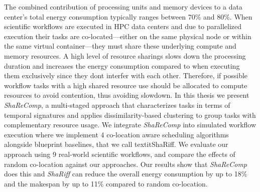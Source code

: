 \documentclass[a4paper, 11pt]{article}
\begin{document}
The combined contribution of processing units and memory devices to a data center's total energy consumption typically ranges between 70\% and 80\%. When scientific workflows are executed in HPC data centers and due to parallelized execution their tasks are co-located—either on the same physical node or within the same virtual container—they must share these underlying compute and memory resources. A high level of resource sharings slows down the processing duration and increases the energy consumption compared to when executing them exclusively since they dont interfer with each other. Therefore, if possible workflow tasks with a high shared resource use should be allocated to compute resources to avoid contention, thus avoiding slowdown. In this thesis we present \textit{ShaReComp}, a multi-staged approach that characterizes tasks in terms of temporal signatures and applies dissimilarity-based clustering to group tasks with complementary resource usage. We integrate \textit{ShaReComp} into simulated workflow execution where we implement 4 co-location aware scheduling algorithms alongside blueprint baselines, that we call  textit{ShaRiff}. We evaluate our approach using 9 real-world scientific workflows, and compare the effects of random co-location against our approaches. Our results show that \textit{ShaReComp} does this and \textit{ShaRiff} can reduce the overall energy consumption by up to 18\% and the makespan by up to 11\% compared to random co-location.
\end{document}

